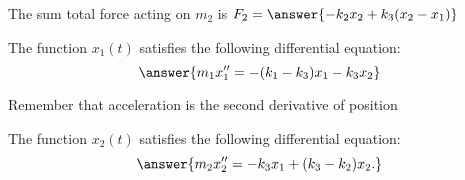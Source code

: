 \documentclass{ximera}%
\begin{document}
\begin{problem}
The sum total force acting on $m_2$ is $F_2 = \answer{-k_2 x_2 + k_3(x_2-x_1)}$
\end{problem}

\begin{problem} The function $x_1(t)$ satisfies the following differential equation:
\[ \answer{m_1 x_1'' = -(k_1-k_3)x_1 -k_3 x_2}\]
\begin{hint} Remember that acceleration is the second derivative of position \end{hint}

\end{problem}

\begin{problem} The function $x_2(t)$ satisfies the following differential equation:
\[ \answer{ m_2 x_2'' = -k_3 x_1 + (k_3-k_2)x_2.}\]
\end{problem}
\end{document}
